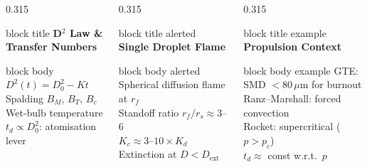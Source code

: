 \documentclass[12pt,aspectratio=169]{beamer}
\begin{document}
{\begin{frame}[plain, c]
  \begin{columns}[t, totalwidth=\textwidth]
    \begin{column}{0.315\textwidth}
      \begin{beamercolorbox}[rounded=true,wd=\linewidth,
                             sep=6pt,center]{block title}
        \textbf{\small D$^2$ Law \& Transfer Numbers}
      \end{beamercolorbox}
      \vspace{3pt}
      \begin{beamercolorbox}[rounded=true,wd=\linewidth,
                             sep=6pt,center]{block body}
        \color{ashgrey}\fontsize{7.5}{10}\selectfont
        $D^2(t) = D_0^2 - Kt$\\[3pt]
        Spalding $B_M$, $B_T$, $B_c$\\[3pt]
        Wet-bulb temperature\\[3pt]
        $t_d \propto D_0^2$: atomisation lever
      \end{beamercolorbox}
    \end{column}
    \hfill
    \begin{column}{0.315\textwidth}
      \begin{beamercolorbox}[rounded=true,wd=\linewidth,
                             sep=6pt,center]{block title alerted}
        \textbf{\small Single Droplet Flame}
      \end{beamercolorbox}
      \vspace{3pt}
      \begin{beamercolorbox}[rounded=true,wd=\linewidth,
                             sep=6pt,center]{block body alerted}
        \color{ashgrey}\fontsize{7.5}{10}\selectfont
        Spherical diffusion flame at $r_f$\\[3pt]
        Standoff ratio $r_f/r_s \approx 3$--$6$\\[3pt]
        $K_c \approx 3$--$10\times K_d$\\[3pt]
        Extinction at $D < D_{\text{ext}}$
      \end{beamercolorbox}
    \end{column}
    \hfill
    \begin{column}{0.315\textwidth}
      \begin{beamercolorbox}[rounded=true,wd=\linewidth,
                             sep=6pt,center]{block title example}
        \textbf{\small Propulsion Context}
      \end{beamercolorbox}
      \vspace{3pt}
      \begin{beamercolorbox}[rounded=true,wd=\linewidth,
                             sep=6pt,center]{block body example}
        \color{white}\fontsize{7.5}{10}\selectfont
        GTE: SMD $< 80\,\mu$m for burnout\\[3pt]
        Ranz--Marshall: forced convection\\[3pt]
        Rocket: supercritical ($p > p_c$)\\[3pt]
        $t_d \approx$ const w.r.t.\ $p$
      \end{beamercolorbox}
    \end{column}
  \end{columns}


\end{frame}}
\end{document}
